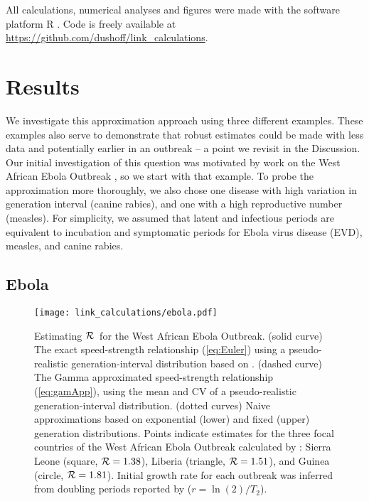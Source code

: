 \documentclass[12pt]{article}
\newcommand{\RR}{\ensuremath{{\cal R}}}
\newcommand{\eref}[1]{(\ref{eq:#1})}
\begin{document}
All calculations, numerical analyses and figures were made with the software platform R \cite{Rproject}. Code is freely available at \url{https://github.com/dushoff/link_calculations}.

\section{Results}\label{Results}

We investigate this approximation approach using three different examples. 
These examples also serve to demonstrate that robust estimates could be made with less data and potentially earlier in an outbreak -- a point we revisit in the Discussion.
Our initial investigation of this question was motivated by work on the West African Ebola Outbreak \cite{WeitDush15}, so we start with that example. To probe the approximation more thoroughly, we also chose one disease with high variation in generation interval (canine rabies), and one with a high reproductive number (measles). For simplicity, we assumed that latent and infectious periods are equivalent to incubation and symptomatic periods for Ebola virus disease (EVD), measles, and canine rabies.


\subsection{Ebola}
\label{EbolaEx}

\begin{figure}[htbp] \centering
	\texttt{[image: link\_calculations/ebola.pdf]}
	\caption{Estimating \RR~for the West African Ebola Outbreak.
(solid curve) The exact speed-strength relationship \eref{Euler} using a pseudo-realistic generation-interval distribution based on \cite{AylwBarb14}.
(dashed curve) The Gamma approximated speed-strength relationship \eref{gamApp}, using the mean and CV of a pseudo-realistic generation-interval distribution. 
(dotted curves) Naive approximations based on exponential (lower) and fixed (upper) generation distributions.
Points indicate estimates for the three focal countries of the West African Ebola Outbreak calculated by \cite{AylwBarb14}: {Sierra Leone (square, $\RR=1.38$), Liberia (triangle, $\RR=1.51$), and Guinea (circle, $\RR=1.81$).} Initial growth rate for each outbreak was inferred from doubling periods reported by \cite{AylwBarb14} ($r = \ln(2)/T_2$). 
	\label{fig:EbolaCurve}}
\end{figure}
\end{document}
